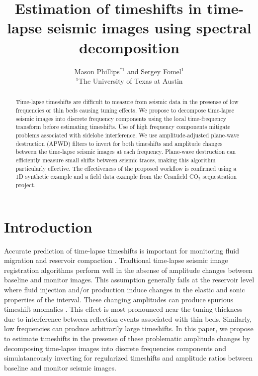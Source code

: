 
\title{Estimation of timeshifts in time-lapse seismic images using spectral decomposition}

\author{Mason Phillips$^{*1}$ and Sergey Fomel$^{1}$
\\
$^1$The University of Texas at Austin}

\maketitle


\begin{abstract}
Time-lapse timeshifts are difficult to measure from seismic data in the presense of low frequencies or thin beds causing tuning effects.
We propose to decompose time-lapse seismic images into discrete frequency components using the local time-frequency transform before estimating timeshifts.
Use of high frequency components mitigate problems associated with sidelobe interference.
We use amplitude-adjusted plane-wave destruction (APWD) filters to invert for both timeshifts and amplitude changes between the time-lapse seismic images at each frequency.
Plane-wave destruction can efficiently measure small shifts between seismic traces, making this algorithm particularly effective.
The effectiveness of the proposed workflow is confirmed using a 1D synthetic example and a field data example from the Cranfield CO$_2$ sequestration project.
\end{abstract}

\section{Introduction}
Accurate prediction of time-lapse timeshifts is important for monitoring fluid migration and reservoir compaction \cite[]{hatchell}.
Tradtional time-lapse seismic image registration algorithms perform well in the absense of amplitude changes between baseline and monitor images. 
This assumption generally fails at the reservoir level where fluid injection and/or production induce changes in the elastic and sonic properties of the interval. 
These changing amplitudes can produce spurious timeshift anomalies \cite[]{macbeth}. 
This effect is most pronounced near the tuning thickness due to interference between reflection events associated with thin beds. 
Similarly, low frequencies can produce arbitrarily large timeshifts.  
In this paper, we propose to estimate timeshifts in the presense of these problematic amplitude changes by decomposing time-lapse images into discrete frequencies components and simulataneously inverting for regularized timeshifts and amplitude ratios between baseline and monitor seismic images.


